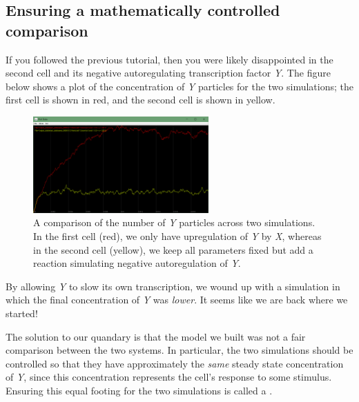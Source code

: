 \begin{note}\end{note} 

\FloatBarrier
{}
\subsection{Ensuring a mathematically controlled comparison}

If you followed the previous tutorial, then you were likely disappointed in the second cell and its negative autoregulating transcription factor \textit{Y}. The figure below shows a plot of the concentration of \textit{Y} particles for the two simulations; the first cell is shown in red, and the second cell is shown in yellow.

\begin{figure}[h]
\centering
\mySfFamily
\includegraphics[width = 0.6\textwidth]{../assets/images/600px/nar_unequal_chart.png}
\caption{A comparison of the number of \textit{Y} particles across two simulations. In the first cell (red), we only have upregulation of \textit{Y} by \textit{X}, whereas in the second cell (yellow), we keep all parameters fixed but add a reaction simulating negative autoregulation of \textit{Y}.}
\label{fig:nar_unequal_chart}
\end{figure}

By allowing \textit{Y} to slow its own transcription, we wound up with a simulation in which the final concentration of \textit{Y} was \textit{lower}. It seems like we are back where we started!

The solution to our quandary is that the model we built was not a fair comparison between the two systems. In particular, the two simulations should be controlled so that they have approximately the \textit{same} steady state concentration of \textit{Y}, since this concentration represents the cell's response to some stimulus. Ensuring this equal footing for the two simulations is called a .

